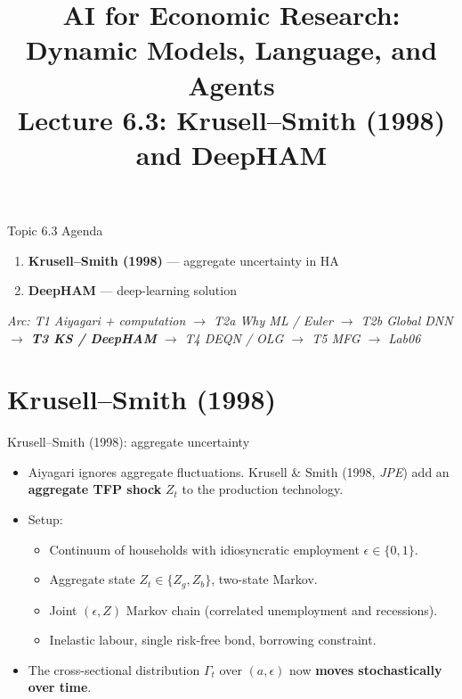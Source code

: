 


\graphicspath{{./pic/}{../../MiniCourse_8hr/Slides/Module2_DL_RL_Macro/pic/}{../}}

\title[AI for Econ Research]{AI for Economic Research: Dynamic Models, Language, and Agents\\
Lecture 6.3: Krusell--Smith (1998) and DeepHAM}



\makebeamertitle

\begin{frame}{Topic 6.3 Agenda}
\begin{enumerate}
  \item \textbf{Krusell--Smith (1998)} --- aggregate uncertainty in HA
  \medskip
  \item \textbf{DeepHAM} --- deep-learning solution
\end{enumerate}
\medskip
\textit{Arc: T1 Aiyagari + computation $\to$ T2a Why ML / Euler $\to$ T2b Global DNN $\to$ \textbf{T3 KS / DeepHAM} $\to$ T4 DEQN / OLG $\to$ T5 MFG $\to$ Lab06}
\end{frame}

\section{Krusell--Smith (1998)}

\begin{frame}{Krusell--Smith (1998): aggregate uncertainty}
\begin{itemize}
\item Aiyagari ignores aggregate fluctuations. Krusell \& Smith (1998, \emph{JPE}) add an \textbf{aggregate TFP shock} $Z_t$ to the production technology.
\medskip
\item Setup:
  \begin{itemize}
  \item Continuum of households with idiosyncratic employment $\epsilon \in \{0,1\}$.
  \item Aggregate state $Z_t \in \{Z_g, Z_b\}$, two-state Markov.
  \item Joint $(\epsilon, Z)$ Markov chain (correlated unemployment and recessions).
  \item Inelastic labour, single risk-free bond, borrowing constraint.
  \end{itemize}
\medskip
\item The cross-sectional distribution $\Gamma_t$ over $(a,\epsilon)$ now \textbf{moves stochastically over time}.
\end{itemize}
\end{frame}

